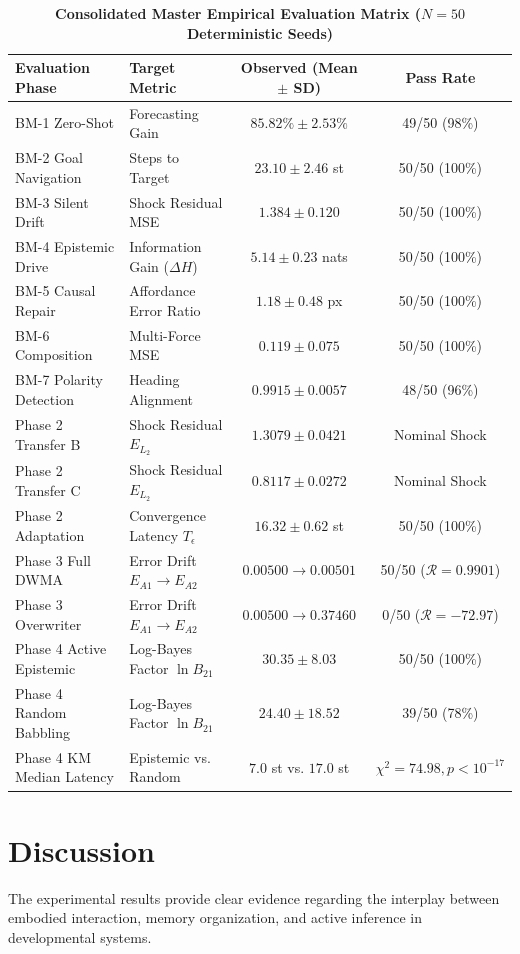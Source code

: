 \documentclass[preprint,12pt]{elsarticle}
\begin{document}
\begin{table}[t]
\centering
\small
\caption{\textbf{Consolidated Master Empirical Evaluation Matrix ($N=50$ Deterministic Seeds)}}
\label{tab:master}
\begin{tabular}{llcc}
\toprule
\textbf{Evaluation Phase} & \textbf{Target Metric} & \textbf{Observed (Mean $\pm$ SD)} & \textbf{Pass Rate} \\
\midrule
BM-1 Zero-Shot & Forecasting Gain & $85.82\% \pm 2.53\%$ & 49/50 (98\%) \\
BM-2 Goal Navigation & Steps to Target & $23.10 \pm 2.46$ st & 50/50 (100\%) \\
BM-3 Silent Drift & Shock Residual MSE & $1.384 \pm 0.120$ & 50/50 (100\%) \\
BM-4 Epistemic Drive & Information Gain ($\Delta H$) & $5.14 \pm 0.23$ nats & 50/50 (100\%) \\
BM-5 Causal Repair & Affordance Error Ratio & $1.18 \pm 0.48$ px & 50/50 (100\%) \\
BM-6 Composition & Multi-Force MSE & $0.119 \pm 0.075$ & 50/50 (100\%) \\
BM-7 Polarity Detection & Heading Alignment & $0.9915 \pm 0.0057$ & 48/50 (96\%) \\
\midrule
Phase 2 Transfer B & Shock Residual $E_{L_2}$ & $1.3079 \pm 0.0421$ & Nominal Shock \\
Phase 2 Transfer C & Shock Residual $E_{L_2}$ & $0.8117 \pm 0.0272$ & Nominal Shock \\
Phase 2 Adaptation & Convergence Latency $T_\epsilon$ & $16.32 \pm 0.62$ st & 50/50 (100\%) \\
\midrule
Phase 3 Full DWMA & Error Drift $E_{A1} \to E_{A2}$ & $0.00500 \to 0.00501$ & 50/50 ($\mathcal{R}=0.9901$) \\
Phase 3 Overwriter & Error Drift $E_{A1} \to E_{A2}$ & $0.00500 \to 0.37460$ & 0/50 ($\mathcal{R}=-72.97$) \\
\midrule
Phase 4 Active Epistemic & Log-Bayes Factor $\ln B_{21}$ & $30.35 \pm 8.03$ & 50/50 (100\%) \\
Phase 4 Random Babbling & Log-Bayes Factor $\ln B_{21}$ & $24.40 \pm 18.52$ & 39/50 (78\%) \\
Phase 4 KM Median Latency & Epistemic vs. Random & $7.0$ st vs. $17.0$ st & $\chi^2 = 74.98, p < 10^{-17}$ \\
\bottomrule
\end{tabular}
\end{table}

\section{Discussion}
\label{sec:discussion}
The experimental results provide clear evidence regarding the interplay between embodied interaction, memory organization, and active inference in developmental systems. 
\end{document}
